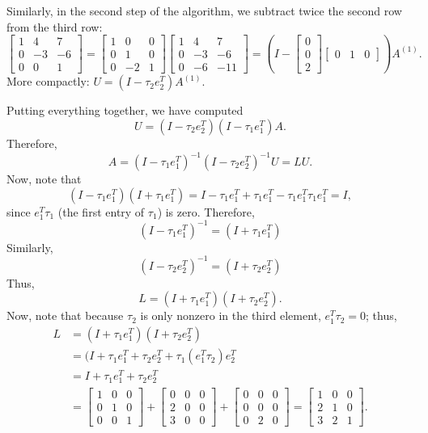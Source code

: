 \documentclass[12pt, leqno]{article} %
\begin{document}
Similarly, in the second step of the algorithm, we subtract twice the second
row from the third row:
\[
  \begin{bmatrix}
    1 &  4 &  7 \\
    0 & -3 & -6 \\
    0 &  0 &  1
  \end{bmatrix} =
  \begin{bmatrix}
    1 & 0 & 0 \\
    0 & 1 & 0 \\
    0 & -2 & 1
  \end{bmatrix}
  \begin{bmatrix}
    1 &  4 &  7 \\
    0 & -3 & -6 \\
    0 & -6 & -11
  \end{bmatrix} =
  \left( I - \begin{bmatrix} 0 \\ 0 \\ 2 \end{bmatrix}
             \begin{bmatrix} 0 & 1 & 0 \end{bmatrix} \right) A^{(1)}.
\]
More compactly: $U = (I-\tau_2 e_2^T) A^{(1)}$.

Putting everything together, we have computed
\[
  U = (I-\tau_2 e_2^T) (I-\tau_1 e_1^T) A.
\]
Therefore,
\[
  A = (I-\tau_1 e_1^T)^{-1} (I-\tau_2 e_2^T)^{-1} U = LU.
\]
Now, note that
\[
  (I-\tau_1 e_1^T) (I + \tau_1 e_1^T) =
  I - \tau_1 e_1^T + \tau_1 e_1^T - \tau_1 e_1^T \tau_1 e_1^T = I,
\]
since $e_1^T \tau_1$ (the first entry of $\tau_1$) is zero.  Therefore,
\[
  (I-\tau_1 e_1^T)^{-1} = (I+\tau_1 e_1^T)
\]
Similarly,
\[
  (I-\tau_2 e_2^T)^{-1} = (I+\tau_2 e_2^T)
\]
Thus,
\[
  L = (I+\tau_1 e_1^T)(I + \tau_2 e_2^T).
\]
Now, note that because $\tau_2$ is only nonzero in the third element,
$e_1^T \tau_2 = 0$; thus,
\begin{align*}
  L &= (I+\tau_1 e_1^T)(I + \tau_2 e_2^T) \\
    &= (I + \tau_1 e_1^T + \tau_2 e_2^T + \tau_1 (e_1^T \tau_2) e_2^T \\
    &= I + \tau_1 e_1^T + \tau_2 e_2^T \\
    &= \begin{bmatrix} 1 & 0 & 0 \\ 0 & 1 & 0 \\ 0 & 0 & 1 \end{bmatrix} +
       \begin{bmatrix} 0 & 0 & 0 \\ 2 & 0 & 0 \\ 3 & 0 & 0 \end{bmatrix} +
       \begin{bmatrix} 0 & 0 & 0 \\ 0 & 0 & 0 \\ 0 & 2 & 0 \end{bmatrix}
     = \begin{bmatrix} 1 & 0 & 0 \\ 2 & 1 & 0 \\ 3 & 2 & 1 \end{bmatrix}.
\end{align*}
\end{document}

